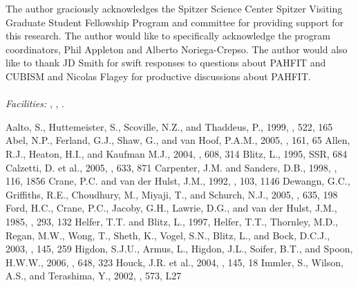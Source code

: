 \documentclass[manuscript]{aastex}
\begin{document}
\acknowledgments

The author graciously acknowledges the Spitzer Science Center Spitzer Visiting Graduate Student Fellowship Program and committee for providing support for this research.  The author would like to specifically acknowledge the program coordinators, Phil Appleton and Alberto Noriega-Crepso.  The author would also like to thank JD Smith for swift responses to questions about PAHFIT and CUBISM and Nicolas Flagey for productive discussions about PAHFIT.\\
\\
{\it Facilities:} , , .

\begin{thebibliography}{}
 Aalto, S., Huttemeister, S., Scoville, N.Z., and Thaddeus, P., 1999, \aj, 522, 165
 Abel, N.P., Ferland, G.J., Shaw, G., and van Hoof, P.A.M., 2005, \apjs, 161, 65
 Allen, R.J., Heaton, H.I., and Kaufman M.J., 2004, \apj, 608, 314
 Blitz, L., 1995, SSR, 684
 Calzetti, D. et al., 2005, \apj, 633, 871
 Carpenter, J.M. and Sanders, D.B., 1998, \aj, 116, 1856
 Crane, P.C. and van der Hulst, J.M., 1992, \aj, 103, 1146
 Dewangn, G.C., Griffiths, R.E., Choudhury, M., Miyaji, T., and Schurch, N.J., 2005, \apj, 635, 198
 Ford, H.C., Crane, P.C., Jacoby, G.H., Lawrie, D.G., and van der Hulst, J.M., 1985, \apj, 293, 132
 Helfer, T.T. and Blitz, L., 1997, 
 Helfer, T.T., Thornley, M.D., Regan, M.W., Wong, T., Sheth, K., Vogel, S.N., Blitz, L., and Bock, D.C.J., 2003, \apjs, 145, 259
 Higdon, S.J.U., Armus, L., Higdon, J.L., Soifer, B.T., and Spoon, H.W.W., 2006, \apj, 648, 323
 Houck, J.R. et al., 2004, \apjs, 145, 18
 Immler, S., Wilson, A.S., and Terashima, Y., 2002, \apj, 573, L27

\end{thebibliography}
\end{document}
